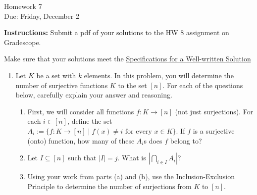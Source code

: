 \documentclass[12pt]{article}
\begin{document}
\begin{center}
{\Large Homework 7}\\
Due: Friday, December 2\\
\end{center}
{\bf Instructions:} Submit a pdf of your solutions to the HW 8 assignment on Gradescope. 

Make sure that your solutions meet the \href{https://docs.google.com/document/d/18LfQoqi6BsY2VdAlpC5xdYEA2rxSGoH0891nVec4_Os/edit?usp=sharing}{Specifications for a Well-written Solution} 

\begin{enumerate}
\item Let $K$ be a set with $k$ elements. In this problem, you will determine the number of surjective functions $K$ to the set $[n]$.  For each of the questions below, carefully explain your answer and reasoning. 
\begin{enumerate}
\item First, we will consider all functions $f:K\to [n]$ (not just surjections). For each $i\in [n]$, define the set $A_i:=\{f:K\to [n]\mid f(x)\ne i \text{ for every } x\in K\}$.  If $f$ is a surjective (onto) function, how many of these $A_i$s does $f$ belong to? 
\item Let $I\subseteq [n]$ such that $|I|=j$. What is $|\bigcap_{i\in I} A_i|$?
\item Using your work from parts (a) and (b), use the Inclusion-Exclusion Principle to determine the number of surjections from $K$ to $[n]$. 
\end{enumerate} 


\end{enumerate}
\end{document}
